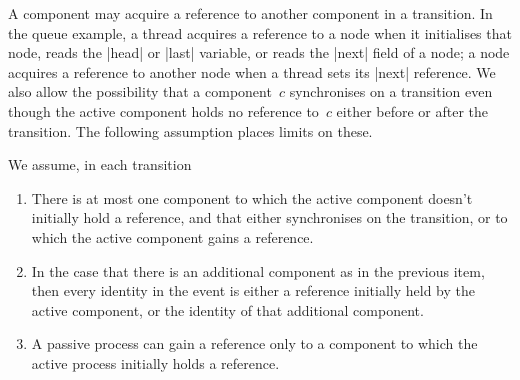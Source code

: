 A component may acquire a reference to another component in a transition.  In
the queue example, a thread acquires a reference to a node when it initialises
that node, reads the |head| or |last| variable, or reads the |next| field of a
node; a node acquires a reference to another node when a thread sets its
|next| reference.  We also allow the possibility that a component~$c$
synchronises on a transition even though the active component holds no
reference to~$c$ either before or after the transition.  The following
assumption places limits on these. 
%
\begin{assumption}
\label{assump:2}
We assume, in each transition
\begin{enumerate}
\item\label{assump:max-one-extra-component} There is at most one component to
  which the active component doesn't initially hold a reference, and that
  either synchronises on the transition, or to which the active component
  gains a reference.

\item\label{assump:extra-event-field} In the case that there is an additional
  component as in the previous item, then every identity in the event is
  either a reference initially held by the active component, or the identity
  of that additional component.

\item\label{assump:secondary-cpts-new-refs} A passive process can gain a
  reference only to a component to which the active process initially holds a
  reference.
\end{enumerate}
\end{assumption}

